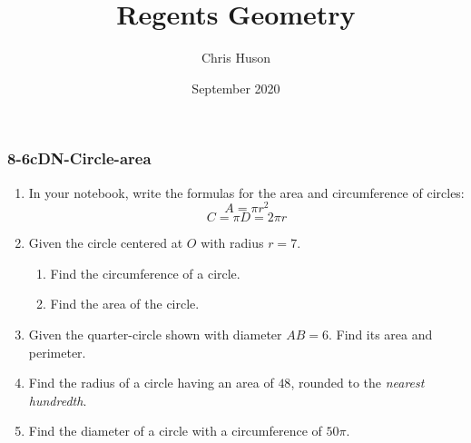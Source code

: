 \documentclass[12pt, twoside]{article}
\title{Regents Geometry}
\author{Chris Huson}
\date{September 2020}
\begin{document}
\subsubsection*{8-6cDN-Circle-area}
\begin{enumerate}
\item In your notebook, write the formulas for the area and circumference of circles:
\[A=\pi r^2\]
\[C=\pi D = 2\pi r\]

\item Given the circle centered at $O$ with radius $r=7$.
  \begin{multicols}{2}
    \begin{enumerate}
      \item Find the circumference of a circle. %
      \item Find the area of the circle.\vspace{3cm}
    \end{enumerate}
  \end{multicols}

\item Given the quarter-circle shown with diameter $AB=6$. Find its area and perimeter.
    \begin{flushright}
  \end{flushright} \vspace{1cm}

\item Find the radius of a circle having an area of $48$, rounded to the \emph{nearest hundredth}. \vspace{2cm}
\item Find the diameter of a circle with a circumference of $50\pi$.


\end{enumerate}
\end{document}
